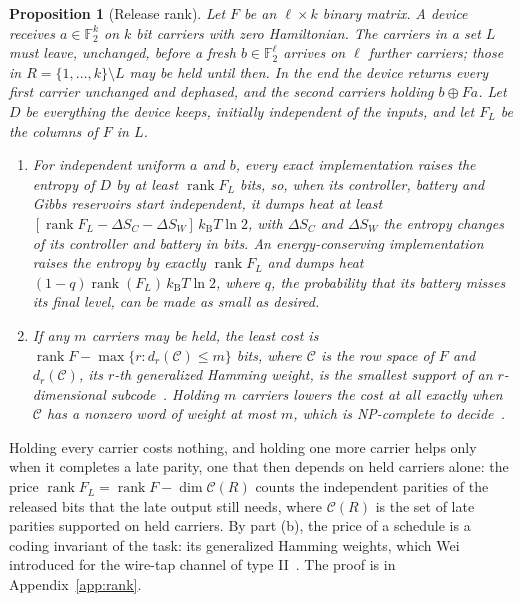 \documentclass[11pt]{article}
\newtheorem{proposition}[theorem]{Proposition}
\theoremstyle{definition}
\theoremstyle{remark}
\newcommand{\kB}{k_{\mathrm B}}
\begin{document}
\begin{proposition}[Release rank]\label{prop:rank}
Let $F$ be an $\ell\times k$ binary matrix. A device receives $a\in\mathbb F_2^k$ on $k$ bit carriers with zero Hamiltonian. The carriers in a set $L$ must leave, unchanged, before a fresh $b\in\mathbb F_2^\ell$ arrives on $\ell$ further carriers; those in $R=\{1,\dots,k\}\setminus L$ may be held until then. In the end the device returns every first carrier unchanged and dephased, and the second carriers holding $b\oplus Fa$. Let $D$ be everything the device keeps, initially independent of the inputs, and let $F_L$ be the columns of $F$ in $L$.
\begin{enumerate}[label=(\alph*)]
\item For independent uniform $a$ and $b$, every exact implementation raises the entropy of $D$ by at least $\operatorname{rank}F_L$ bits, so, when its controller, battery and Gibbs reservoirs start independent, it dumps heat at least $[\operatorname{rank}F_L-\Delta S_C-\Delta S_W]\,\kB T\ln2$, with $\Delta S_C$ and $\Delta S_W$ the entropy changes of its controller and battery in bits. An energy-conserving implementation raises the entropy by exactly $\operatorname{rank}F_L$ and dumps heat $(1-q)\operatorname{rank}(F_L)\,\kB T\ln2$, where $q$, the probability that its battery misses its final level, can be made as small as desired.
\item If any $m$ carriers may be held, the least cost is $\operatorname{rank}F-\max\{r:d_r(\mathcal C)\le m\}$ bits, where $\mathcal C$ is the row space of $F$ and $d_r(\mathcal C)$, its $r$-th generalized Hamming weight, is the smallest support of an $r$-dimensional subcode~\cite{Wei91}. Holding $m$ carriers lowers the cost at all exactly when $\mathcal C$ has a nonzero word of weight at most $m$, which is NP-complete to decide~\cite{Vardy97}.
\end{enumerate}
\end{proposition}

Holding every carrier costs nothing, and holding one more carrier helps only when it completes a late parity, one that then depends on held carriers alone: the price $\operatorname{rank}F_L=\operatorname{rank}F-\dim\mathcal C(R)$ counts the independent parities of the released bits that the late output still needs, where $\mathcal C(R)$ is the set of late parities supported on held carriers. By part (b), the price of a schedule is a coding invariant of the task: its generalized Hamming weights, which Wei introduced for the wire-tap channel of type II~\cite{Wei91}. The proof is in Appendix~\ref{app:rank}.
\end{document}
